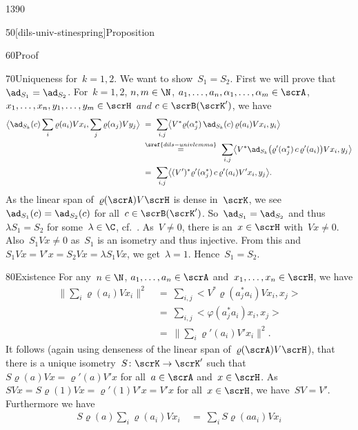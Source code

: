 \begin{parsec}{1390}
\begin{point}{50}[dils-univ-stinespring]{Proposition}
\begin{point}{60}{Proof}
\begin{point}{70}{Uniqueness}
for~$k =1,2$.
We want to show~$S_1=S_2$.
First we will prove that~$\ad_{S_1} = \ad_{S_2}$.
For~$k=1,2$, $n, m\in \N$, $a_1, \ldots, a_n,\alpha_1, \ldots, \alpha_m \in \scrA$,
$x_1, \ldots, x_n, y_1, \ldots, y_m \in \scrH$ \emph{and}
    $c \in \scrB(\scrK')$,
    we have
\begin{align*}
    \bigl< \ad_{S_k}(c)
        \sum_i \varrho(a_i) V x_i,
        \sum_j \varrho(\alpha_j) V y_j \bigr>
    &\ = \ \sum_{i,j}
        \bigl< V^* \varrho(\alpha_j^*) \,\ad_{S_k}(c)\, \varrho(a_i) V x_i, y_i
            \bigr> \\
            & \ \stackrel{\sref{dils-univlemma}}{=} \ \sum_{i,j}
        \bigl< V^* \ad_{S_k} \bigl(\varrho'(\alpha_j^*) \,c\,
            \varrho'(a_i)\bigr) V x_i, y_j\bigr> \\
    & \ =\  \sum_{i,j}
        \bigl< (V')^* \varrho'(\alpha_j^*) \,c\, \varrho'(a_i) V' x_i, y_j
            \bigr>.
\end{align*}
As the linear span of~$\varrho(\scrA) V\scrH$ is dense in~$\scrK$,
we see~$\ad_{S_1}(c) = \ad_{S_2}(c)$ for all~$c \in \scrB(\scrK')$.
So~$\ad_{S_1} = \ad_{S_2}$
    and thus $\lambda S_1= S_2$ for some~$\lambda \in \C$,
cf.~\cite[lem.~9]{westerbaan2016universal}.
As~$V \neq 0$, there is an~$x \in \scrH$ with~$Vx \neq 0$.
Also~$S_1 V x \neq 0$ as~$S_1$ is an isometry and thus injective.
From this and~$S_1 V x = V'x = S_2Vx = \lambda S_1 Vx$, we get~$\lambda=1$.
Hence~$S_1=S_2$.
\end{point}
\begin{point}{80}{Existence}%
For any~$n \in \N$, $a_1, \ldots, a_n \in \scrA$
    and~$x_1, \ldots, x_n \in \scrH$, we have
\begin{align*}
\bigl\| \sum_i \varrho(a_i)Vx_i \bigr\|^2
&\ =\  \sum_{i,j} \bigl< V^* \varrho(a_j^*a_i) Vx_i, x_j\bigr> \\
&\ =\  \sum_{i,j} \bigl< \varphi(a_j^* a_i)x_i, x_j \bigr> \\
&\ =\  \bigl\| \sum_i \varrho'(a_i) V'x_i \bigr\|^2.
\end{align*}
It follows (again
    using denseness of the linear span of~$\varrho(\scrA) V \scrH$),
that there is a unique isometry~$S\colon \scrK \to \scrK'$
    such that~$S\varrho(a) Vx = \varrho'(a)V' x$
        for all~$a\in \scrA$ and~$x \in\scrH$.
As~$SVx = S\varrho(1)Vx=\varrho'(1)V'x = V'x$ for all~$x\in \scrH$,
    we have~$SV = V'$. Furthermore
we have
\begin{align*}
    S \varrho(a) \sum_i \varrho(a_i)Vx_i
    &\ =\  \sum_i S \varrho(aa_i) Vx_i \\

\end{align*}
\end{point}
\end{point}
\end{point}
\end{parsec}
